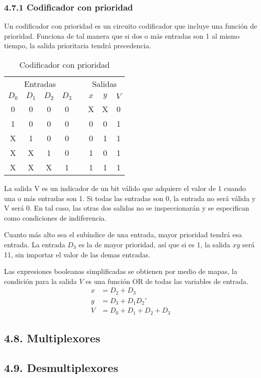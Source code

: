 \subsubsection*{4.7.1 Codificador con prioridad}
Un codificador con prioridad es un circuito codificador que incluye una funci\'{o}n de prioridad. Funciona
de tal manera que si dos o m\'{a}s entradas son 1 al mismo tiempo, la salida prioritaria tendr\'{a} precedencia.

\begin{table}[h]
    \centering
    \begin{tabular}{cccc c ccc}
        \toprule
        \multicolumn{4}{c}{Entradas} &       & \multicolumn{3}{c}{Salidas}                              \\
        \cmidrule{1-4} \cmidrule{6-8}
        $D_0$                        & $D_1$ & $D_2$                       & $D_3$ &  & $x$ & $y$ & $V$ \\
        \midrule
        0                            & 0     & 0                           & 0     &  & X   & X   & 0   \\
        1                            & 0     & 0                           & 0     &  & 0   & 0   & 1   \\
        X                            & 1     & 0                           & 0     &  & 0   & 1   & 1   \\
        X                            & X     & 1                           & 0     &  & 1   & 0   & 1   \\
        X                            & X     & X                           & 1     &  & 1   & 1   & 1   \\
        \bottomrule
    \end{tabular}
    \caption{Codificador con prioridad}
\end{table}

La salida V es un indicador de un bit v\'{a}lido  que adquiere el valor de 1 cuando una o m\'{a}s entradas son 1.
Si todas las entradas son 0, la entrada no ser\'{a} v\'{a}lida y V ser\'{a} 0. En tal caso, las otras dos salidas
no se inspeccionar\'{a}n y se especifican como condiciones de indiferencia.

Cuanto m\'{a}s alto sea el sub\'{i}ndice de una entrada, mayor prioridad tendr\'{a} esa entrada. La entrada $D_3$
es la de mayor prioridad, as\'{i} que si es 1, la salida $xy$ ser\'{a} 11, sin importar el valor de las demas entradas.

Las expresiones booleanas simplificadas se obtienen por medio de mapas, la condici\'{o}n para la salida $V$ es una funci\'{o}n
OR de todas las variables de entrada.
\begin{align*}
    x & = D_2 + D_3             \\
    y & = D_3 + D_1D_2'         \\
    V & = D_0 + D_1 + D_2 + D_3
\end{align*}

\subsection*{4.8. Multiplexores}
\subsection*{4.9. Desmultiplexores}